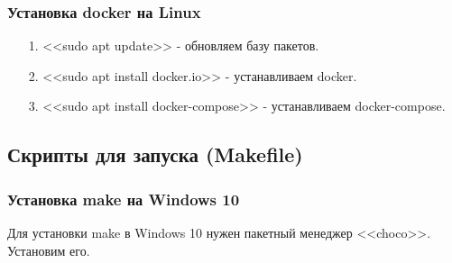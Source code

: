 \subsubsection*{Установка docker на Linux}

\begin{itemize}
    \item[1.] <<sudo apt update>> - обновляем базу пакетов.
    \item[2.] <<sudo apt install docker.io>> - устанавливаем docker.
    \item[3.] <<sudo apt install docker-compose>> - устанавливаем docker-compose.
\end{itemize}

\newpage


\subsection{Скрипты для запуска (Makefile)}

\subsubsection*{Установка make на Windows 10}

Для установки make в Windows 10 нужен пакетный менеджер <<choco>>. Установим его.

